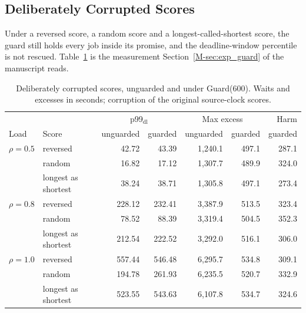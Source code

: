 \documentclass[mathematics,supfile,submit,moreauthors]{Definitions/mdpi}
\newcommand{\devnum}[1]{#1}
\begin{document}
\subsection{Deliberately Corrupted Scores}
\label{sec:supp_adv}

Under a reversed score, a random score and a longest-called-shortest score, the guard
still holds every job inside its promise, and the deadline-window percentile is not
rescued. Table~\ref{tab:s_adv} is the measurement Section~\ref*{M-sec:exp_guard} of the manuscript reads.

\begin{table}[htbp]
\centering
\caption{Deliberately corrupted scores, unguarded and under Guard($\devnum{600}$).
Waits and excesses in seconds; corruption of the original source-clock scores.}
\label{tab:s_adv}
\small
\begin{tabular}{llrrrrr}
\toprule
 & & \multicolumn{2}{c}{p99$_{\mathrm{dl}}$} & \multicolumn{2}{c}{Max excess} & Harm \\
Load & Score & unguarded & guarded & unguarded & guarded & guarded \\
\midrule
$\rho = \devnum{0.5}$ & reversed    & \devnum{42.72}  & \devnum{43.39}  & \devnum{1{,}240.1} & \devnum{497.1} & \devnum{287.1} \\
                      & random      & \devnum{16.82}  & \devnum{17.12}  & \devnum{1{,}307.7} & \devnum{489.9} & \devnum{324.0} \\
                      & longest as shortest & \devnum{38.24} & \devnum{38.71} & \devnum{1{,}305.8} & \devnum{497.1} & \devnum{273.4} \\
$\rho = \devnum{0.8}$ & reversed    & \devnum{228.12} & \devnum{232.41} & \devnum{3{,}387.9} & \devnum{513.5} & \devnum{323.4} \\
                      & random      & \devnum{78.52}  & \devnum{88.39}  & \devnum{3{,}319.4} & \devnum{504.5} & \devnum{352.3} \\
                      & longest as shortest & \devnum{212.54} & \devnum{222.52} & \devnum{3{,}292.0} & \devnum{516.1} & \devnum{306.0} \\
$\rho = \devnum{1.0}$ & reversed    & \devnum{557.44} & \devnum{546.48} & \devnum{6{,}295.7} & \devnum{534.8} & \devnum{309.1} \\
                      & random      & \devnum{194.78} & \devnum{261.93} & \devnum{6{,}235.5} & \devnum{520.7} & \devnum{332.9} \\
                      & longest as shortest & \devnum{523.55} & \devnum{543.63} & \devnum{6{,}107.8} & \devnum{534.7} & \devnum{324.6} \\
\bottomrule
\end{tabular}
\end{table}
\end{document}
